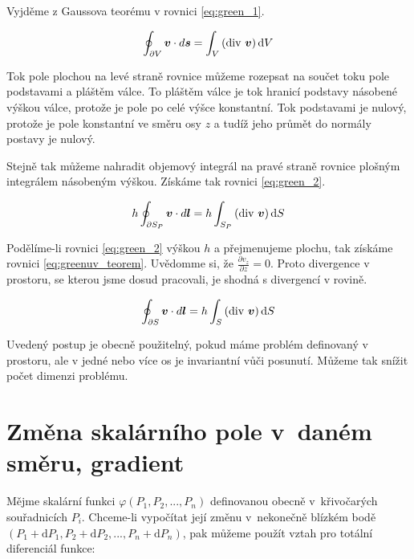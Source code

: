 Vyjděme z Gaussova teorému v rovnici \eqref{eq:green_1}.

\begin{equation}
\label{eq:green_1}
\oint_{\partial V} \vect{v} \cdot d\vect{s} = \int_V \left(\diverg \ \vect{v} \right) \mathrm{d}V
\end{equation}

Tok pole plochou na levé straně rovnice můžeme rozepsat na součet toku pole podstavami a pláštěm válce.
To pláštěm válce je tok hranicí podstavy násobené výškou válce, protože je pole po celé výšce konstantní. Tok podstavami je nulový, protože je pole konstantní ve směru osy \(z\) a tudíž jeho průmět do normály postavy je nulový.

Stejně tak můžeme nahradit objemový integrál na pravé straně rovnice plošným integrálem násobeným výškou. Získáme tak rovnici \eqref{eq:green_2}.

\begin{equation}
\label{eq:green_2}
h \oint_{\partial S_P} \boldsymbol{v} \cdot d\boldsymbol{l} = h \int_{S_P} \left(\mathrm{div} \ \boldsymbol{v} \right) \mathrm{d}S
\end{equation}

Podělíme-li rovnici \eqref{eq:green_2} výškou \(h\) a přejmenujeme plochu, tak získáme rovnici \eqref{eq:greenuv_teorem}. Uvědomme si, že \(\frac{\partial v_z}{\partial z} = 0\).
Proto divergence v prostoru, se kterou jsme dosud pracovali, je shodná s divergencí v rovině.

\begin{equation}
\label{eq:greenuv_teorem}
\oint_{\partial S} \vect{v} \cdot d\vect{l} = h \int_S \left(\diverg \ \vect{v} \right) \mathrm{d}S
\end{equation}

Uvedený postup je obecně použitelný, pokud máme problém definovaný v prostoru, ale v jedné nebo více os je invariantní vůči posunutí. Můžeme tak snížit
počet dimenzi problému.

\section{Změna skalárního pole v~daném směru, gradient}

Mějme skalární funkci \(\varphi(P_1, P_2, ..., P_n)\) definovanou obecně v~křivočarých souřadnicích \(P_i\). Chceme-li vypočítat její změnu v~nekonečně blízkém bodě \((P_1 + \mathrm{d}P_1, P_2 + \mathrm{d}P_2, ..., P_n + \mathrm{d}P_n)\), pak
můžeme použít vztah pro totální diferenciál funkce:

